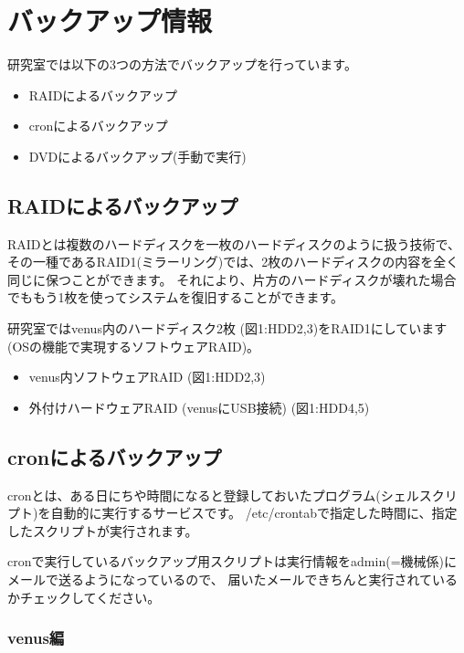 \documentclass[11pt]{jarticle}
\begin{document}
\section{バックアップ情報}

研究室では以下の3つの方法でバックアップを行っています。
\begin{itemize}
\item RAIDによるバックアップ
\item cronによるバックアップ
\item DVDによるバックアップ(手動で実行)
\end{itemize}



\subsection{RAIDによるバックアップ}

RAIDとは複数のハードディスクを一枚のハードディスクのように扱う技術で、
その一種であるRAID1(ミラーリング)では、2枚のハードディスクの内容を全く同じに保つことができます。
それにより、片方のハードディスクが壊れた場合でももう1枚を使ってシステムを復旧することができます。

研究室ではvenus内のハードディスク2枚 (図1:HDD2,3)をRAID1にしています
(OSの機能で実現するソフトウェアRAID)。


\begin{itemize}
\item venus内ソフトウェアRAID (図1:HDD2,3)
\item 外付けハードウェアRAID (venusにUSB接続) (図1:HDD4,5) %
\end{itemize}
\fi


\subsection{cronによるバックアップ \label{sub:cron}}

cronとは、ある日にちや時間になると登録しておいたプログラム(シェルスクリプト)を自動的に実行するサービスです。
/etc/crontabで指定した時間に、指定したスクリプトが実行されます。

cronで実行しているバックアップ用スクリプトは実行情報をadmin(=機械係)にメールで送るようになっているので、
届いたメールできちんと実行されているかチェックしてください。


\subsubsection{venus編 \label{subsub:cron_venus}}
\end{document}
